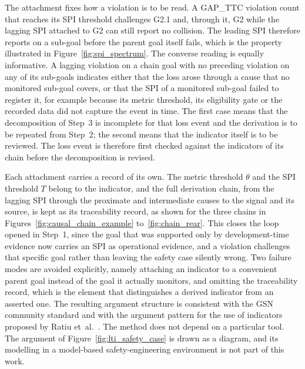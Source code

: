 The attachment fixes how a violation is to be read. A GAP\_TTC violation count
that reaches its SPI threshold challenges G2.1 and, through it, G2
while the lagging SPI attached to G2 can still report no collision. The
leading SPI therefore reports on a sub-goal before the parent goal itself
fails, which is the property illustrated in Figure~\ref{fig:spi_spectrum}. The
converse reading is equally informative. A lagging violation on a chain goal with
no preceding violation on any of its sub-goals indicates either that the loss arose
through a cause that no monitored sub-goal covers, or that the SPI of a monitored
sub-goal failed to register it, for example because its metric threshold, its eligibility
gate or the recorded data did not capture the event in time. The first case means
that the decomposition of Step~3 is incomplete for that loss event and the
derivation is to be repeated from Step~2; the second means that the indicator
itself is to be reviewed. The loss event is therefore first checked against the
indicators of its chain before the decomposition is revised.

Each attachment carries a record of its own. The metric threshold $\theta$ and the
SPI threshold $T$ belong to the indicator, and the full derivation chain, from the
lagging SPI through the proximate and intermediate causes to the signal and its
source, is kept as its traceability record, as shown for the three chains in
Figures~\ref{fig:causal_chain_example} to~\ref{fig:chain_rear}. This closes the loop opened in Step~1, since the goal that
was supported only by development-time evidence now carries an SPI as operational
evidence, and a violation challenges that specific goal rather than leaving the safety case silently wrong.
Two failure modes are avoided explicitly, namely attaching an indicator to a
convenient parent goal instead of the goal it actually monitors, and omitting the
traceability record, which is the element that distinguishes a derived indicator
from an asserted one. The resulting argument structure is consistent with the
\ac{GSN} community standard \cite{gsncs2021} and with the argument pattern for the
use of indicators proposed by Ratiu et~al.\ \cite{ratiu2024}. The method does not
depend on a particular tool. The argument of Figure~\ref{fig:lti_safety_case} is drawn
as a diagram, and its modelling in a model-based safety-engineering environment is not
part of this work.

